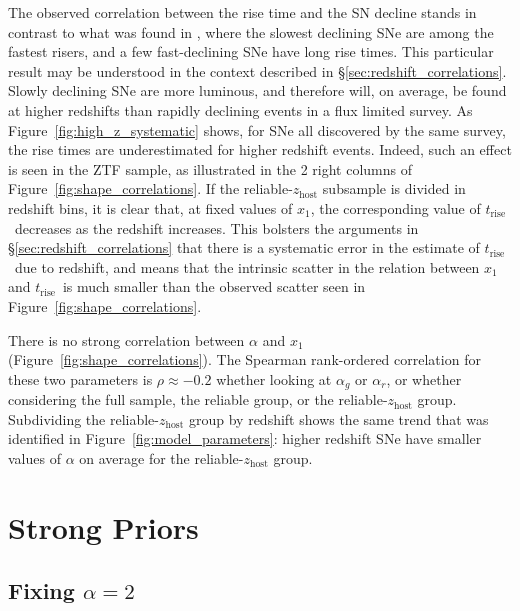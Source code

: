 \documentclass[twocolumn]{./aastex63}
\newcommand{\trise}{$t_\mathrm{rise}$}
\begin{document}
The observed correlation between the rise time and the SN decline stands in
contrast to what was found in \citet{Hayden10}, where the slowest declining
SNe are among the fastest risers, and a few fast-declining SNe have long rise
times. This particular result may be understood in the context described in
\S\ref{sec:redshift_correlations}. Slowly declining SNe are more luminous, and
therefore will, on average, be found at higher redshifts than rapidly
declining events in a flux limited survey. As
Figure~\ref{fig:high_z_systematic} shows, for SNe all discovered by the same
survey, the rise times are underestimated for higher redshift events. Indeed,
such an effect is seen in the ZTF sample, as illustrated in the 2 right
columns of Figure~\ref{fig:shape_correlations}. If the
reliable-$z_\mathrm{host}$ subsample is divided in redshift bins, it is clear
that, at fixed values of $x_1$, the corresponding value of \trise\ decreases
as the redshift increases. This bolsters the arguments in
\S\ref{sec:redshift_correlations} that there is a systematic error in the
estimate of \trise\ due to redshift, and means that the intrinsic scatter in
the relation between $x_1$ and \trise\ is much smaller than the observed
scatter seen in Figure~\ref{fig:shape_correlations}.

There is no strong correlation between $\alpha$ and $x_1$
(Figure~\ref{fig:shape_correlations}). The Spearman rank-ordered correlation
for these two parameters is $\rho \approx -0.2$ whether looking at $\alpha_g$
or $\alpha_r$, or whether considering the full sample, the reliable group, or
the reliable-$z_\mathrm{host}$ group. Subdividing the
reliable-$z_\mathrm{host}$ group by redshift shows the same trend that was
identified in Figure~\ref{fig:model_parameters}: higher redshift SNe have
smaller values of $\alpha$ on average for the reliable-$z_\mathrm{host}$ group.

\section{Strong Priors}\label{sec:strong_priors}

\subsection{Fixing $\alpha = 2$}
\end{document}
